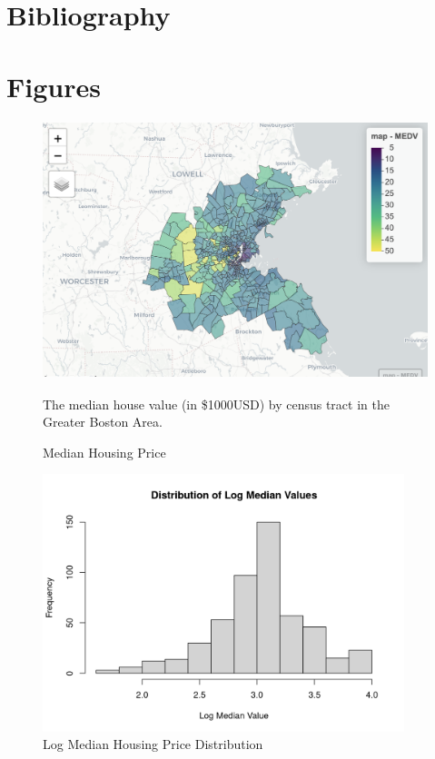 \documentclass[11pt]{article}
\begin{document}
\newpage

\section{Bibliography}




\newpage



\section{Figures}

\begin{figure}[h!] 
  \centering
  \includegraphics[height=75mm]{prices.png}
  \caption{Median Housing Price}
  \medskip
	\small
	The median house value (in \$1000USD) by census tract in the Greater Boston Area.
  \label{fig:prices}
\end{figure}

\begin{figure}[h!] 
  \centering
  \includegraphics[height=75mm]{price_dist.png}
  \caption{Log Median Housing Price Distribution}
  \label{fig:price_dist}
\end{figure}
\end{document}
